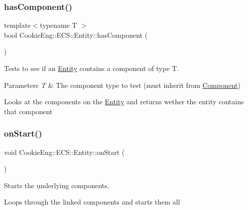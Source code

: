 \subsubsection{\texorpdfstring{has\+Component()}{hasComponent()}}
{\footnotesize\ttfamily template$<$typename T $>$ \\
bool Cookie\+Eng\+::\+E\+C\+S\+::\+Entity\+::has\+Component (\begin{DoxyParamCaption}{ }\end{DoxyParamCaption})\hspace{0.3cm}{\ttfamily [inline]}}



Tests to see if an \hyperlink{class_cookie_eng_1_1_e_c_s_1_1_entity}{Entity} contains a component of type T. 


\begin{DoxyParams}{Parameters}
{\em T} & The component type to test (must inherit from \hyperlink{class_cookie_eng_1_1_e_c_s_1_1_component}{Component})\\
\hline
\end{DoxyParams}
Looks at the components on the \hyperlink{class_cookie_eng_1_1_e_c_s_1_1_entity}{Entity} and returns wether the entity contains that component \mbox{\label{class_cookie_eng_1_1_e_c_s_1_1_entity_aa20c5dad3b6d92629cb6900ecd81a051}} 
\subsubsection{\texorpdfstring{on\+Start()}{onStart()}}
{\footnotesize\ttfamily void Cookie\+Eng\+::\+E\+C\+S\+::\+Entity\+::on\+Start (\begin{DoxyParamCaption}{ }\end{DoxyParamCaption})\hspace{0.3cm}{\ttfamily [inline]}}



Starts the underlying components. 

Loops through the linked components and starts them all \mbox{\label{class_cookie_eng_1_1_e_c_s_1_1_entity_a6dde99658786478b528eb2cca86ba851}} 
